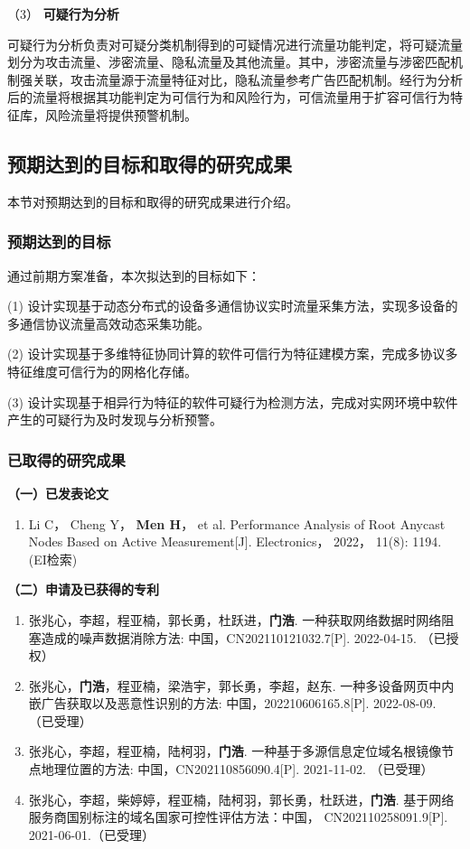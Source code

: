 （3） \textbf{可疑行为分析}\quad

可疑行为分析负责对可疑分类机制得到的可疑情况进行流量功能判定，将可疑流量划分为攻击流量、涉密流量、隐私流量及其他流量。其中，涉密流量与涉密匹配机制强关联，攻击流量源于流量特征对比，隐私流量参考广告匹配机制。经行为分析后的流量将根据其功能判定为可信行为和风险行为，可信流量用于扩容可信行为特征库，风险流量将提供预警机制。

\subsection{预期达到的目标和取得的研究成果}
本节对预期达到的目标和取得的研究成果进行介绍。
\subsubsection{预期达到的目标}

通过前期方案准备，本次拟达到的目标如下：

(1) 设计实现基于动态分布式的设备多通信协议实时流量采集方法，实现多设备的多通信协议流量高效动态采集功能。

(2) 设计实现基于多维特征协同计算的软件可信行为特征建模方案，完成多协议多特征维度可信行为的网格化存储。

(3) 设计实现基于相异行为特征的软件可疑行为检测方法，完成对实网环境中软件产生的可疑行为及时发现与分析预警。

\subsubsection{已取得的研究成果}

	\noindent\textbf{（一）已发表论文}
	\begin{enumerate}
	\item Li C， Cheng Y， \textbf{Men H}， et al. Performance Analysis of Root Anycast Nodes Based on Active Measurement[J]. Electronics， 2022， 11(8): 1194. \quad (EI检索)
\end{enumerate}
\noindent\textbf{（二）申请及已获得的专利}
\begin{enumerate}
\item 张兆心，李超，程亚楠，郭长勇，杜跃进，\textbf{门浩}. 一种获取网络数据时网络阻塞造成的噪声数据消除方法: 中国，CN202110121032.7[P]. 2022-04-15. （已授权）
\item 张兆心，\textbf{门浩}，程亚楠，梁浩宇，郭长勇，李超，赵东. 一种多设备网页中内嵌广告获取以及恶意性识别的方法: 中国，202210606165.8[P]. 2022-08-09. （已受理）
\item 张兆心，李超，程亚楠，陆柯羽，\textbf{门浩}. 一种基于多源信息定位域名根镜像节点地理位置的方法: 中国，CN202110856090.4[P]. 2021-11-02. （已受理）
\item 张兆心，李超，柴婷婷，程亚楠，陆柯羽，郭长勇，杜跃进，\textbf{门浩}. 基于网络服务商国别标注的域名国家可控性评估方法：中国， CN202110258091.9[P]. 2021-06-01.（已受理）
\end{enumerate}

